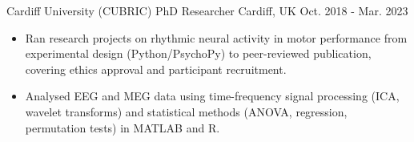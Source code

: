 \begin{cventries}
  \cventry
    {Cardiff University (CUBRIC)} %
    {PhD Researcher} %
    {Cardiff, UK} %
    {Oct. 2018 - Mar. 2023} %
    {\renewcommand{\labelitemii}{\bullet}
      \begin{cvitems} %
        \item[] {\jobstyle{} 
            \begin{itemize} %
            \item {Ran research projects on rhythmic neural activity in motor performance from experimental design (Python/PsychoPy) to peer-reviewed publication, covering ethics approval and participant recruitment.}
            \item {Analysed EEG and MEG data using time-frequency signal processing (ICA, wavelet transforms) and statistical methods (ANOVA, regression, permutation tests) in MATLAB and R.}
              \end{itemize}}  
       \end{cvitems}
    }
\end{cventries}
